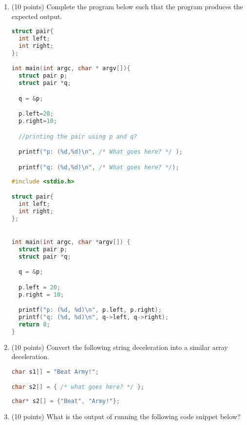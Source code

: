 \documentclass{article}[9pt]
\newenvironment{answerfont}{\fontfamily{qhv}\selectfont}{\par}
\newenvironment{myanswer}{\begin{mdframed}\begin{answerfont}}{\end{answerfont}\end{mdframed}}
\begin{document}
\begin{enumerate}
\item (10 points) Complete the program below such that the program produces the expected output.

\begin{lstlisting}[language=c]
struct pair{
  int left;
  int right;
};

int main(int argc, char * argv[]){
  struct pair p;
  struct pair *q;

  q = &p;

  p.left=20;
  p.right=10;

  //printing the pair using p and q?

  printf("p: (%d,%d)\n", /* What goes here? */ );

  printf("q: (%d,%d)\n", /* What goes here? */);
\end{lstlisting}

\begin{myanswer}
\begin{lstlisting}[language=c]
#include <stdio.h>

struct pair{
  int left;
  int right;
};


int main(int argc, char *argv[]) {
  struct pair p;
  struct pair *q;

  q = &p;

  p.left = 20;
  p.right = 10;

  printf("p: (%d, %d)\n", p.left, p.right);
  printf("q: (%d, %d)\n", q->left, q->right);
  return 0;
}
\end{lstlisting}
\end{myanswer}

\item (10 points) Convert the following string deceleration into a similar array deceleration.

\begin{lstlisting}[language=c]
char s1[] = "Beat Army!";

char s2[] = { /* what goes here? */ };
\end{lstlisting}

\begin{myanswer}
\begin{lstlisting}[language=c]
char* s2[] = {"Beat", "Army!"};
\end{lstlisting}
\end{myanswer}

\item (10 points) What is the output of running the following code snippet below?


\end{enumerate}
\end{document}
